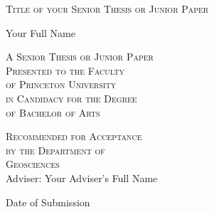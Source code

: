 \thispagestyle{empty}
  \begin{center}
    \textsc{\LARGE Title of your Senior Thesis or Junior Paper} %
  \end{center}
  \vspace{.6in}
  \begin{center}
    Your Full Name %
  \end{center}
  \vspace{.6in}
  \begin{center}
    \textsc{A Senior Thesis or Junior Paper \\ %
    Presented to the Faculty \\
    of Princeton University \\
    in Candidacy for the Degree \\
    of Bachelor of Arts}
  \end{center}
  \vspace{.3in}
  \begin{center}
    \textsc{Recommended for Acceptance \\
    by the Department of \\
    Geosciences \\}
    Adviser: Your Adviser's Full Name %
  \end{center}
  \vspace{.3in}
  \begin{center}
    Date of Submission %
  \end{center}
  
  \clearpage